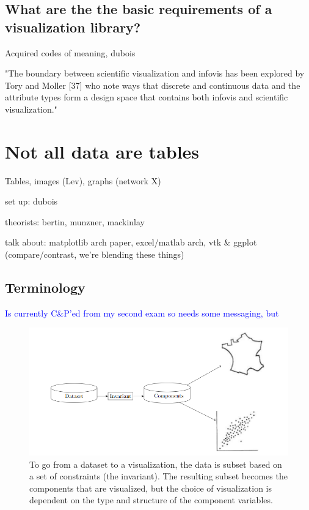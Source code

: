 \documentclass[../main.tex]{subfiles}
\begin{document}
\subsection{ What are the the basic requirements of a visualization library?}
Acquired codes of meaning, dubois


"The boundary between scientific visualization and infovis has been explored by Tory and Moller [37] who note ways that discrete and continuous data and the attribute types form a design space that contains both infovis and scientific visualization." \cite{pousmanCasualInformation2007}

\section{Not all data are tables}

Tables, images (Lev), graphs (network X)

set up: dubois

theorists:
bertin, munzner, mackinlay

talk about:
matplotlib arch paper, excel/matlab arch, 
vtk \& ggplot (compare/contrast, we're blending these things) 


\subsection{Terminology}
\textcolor{blue}{Is currently C\&P'ed from my second exam so needs some messaging, but }
\begin{figure}[h!]
\includegraphics[width=\textwidth]{figures/intro/flowchart.png} 
\caption{To go from a dataset to a visualization, the data is subset based on a set of constraints (the invariant). The resulting subset becomes the components that are visualized, but the choice of visualization is dependent on the type and structure of the component variables.}
\label{fig:flowchart}
\end{figure}
\end{document}

